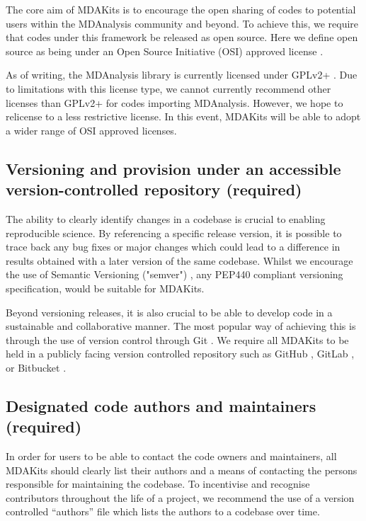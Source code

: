\documentclass[9pt,whitepaper]{livecoms}
\begin{document}
The core aim of MDAKits is to encourage the open sharing of codes to potential users within the MDAnalysis community and beyond. To achieve this, we require that codes under this framework be released as open source. Here we define open source as being under an Open Source Initiative (OSI) approved license \cite{open_source_initiative_licenses_nodate}.

As of writing, the MDAnalysis library is currently licensed under GPLv2+ \cite{noauthor_gnu_nodate}. Due to limitations with this license type, we cannot currently recommend other licenses than GPLv2+ for codes importing MDAnalysis. However, we hope to relicense to a less restrictive license. In this event, MDAKits will be able to adopt a wider range of OSI approved licenses.
 
\subsection{Versioning and provision under an accessible version-controlled repository (required)}
\label{sec:versioning}

The ability to clearly identify changes in a codebase is crucial to enabling reproducible science. By referencing a specific release version, it is possible to trace back any bug fixes or major changes which could lead to a difference in results obtained with a later version of the same codebase. Whilst we encourage the use of Semantic Versioning ("semver") \cite{preston-werner_semantic_nodate}, any PEP440 \cite{noauthor_pep_nodate-1} compliant versioning specification, would be suitable for MDAKits.

Beyond versioning releases, it is also crucial to be able to develop code in a sustainable and collaborative manner. The most popular way of achieving this is through the use of version control through Git \cite{noauthor_git_nodate}. We require all MDAKits to be held in a publicly facing version controlled repository such as GitHub \cite{github_inc_github_2022}, GitLab \cite{gitlab_inc_gitlab_2022}, or Bitbucket \cite{atlassian_bitbucket_2022}.

\subsection{Designated code authors and maintainers (required)}
\label{sec:authors}

In order for users to be able to contact the code owners and maintainers, all MDAKits should clearly list their authors and a means of contacting the persons responsible for maintaining the codebase. To incentivise and recognise contributors throughout the life of a project, we recommend the use of a version controlled “authors” file which lists the authors to a codebase over time.
 
\end{document}
